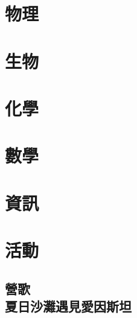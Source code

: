 \documentclass[a4paper, twoside, openany, oldfontcommands]{memoir}
\let\cleardoublepage=\clearpage
\theoremstyle{definition}
\begin{document}
\tableofcontents
\setcounter{chapter}{-1}

\let\cleardoublepage\clearpage
\part{物理}




\part{生物}




\part{化學}



\part{數學}




\part{資訊}


\part{活動}



\chapter{營歌\\夏日沙灘遇見愛因斯坦}

	
\end{document}
